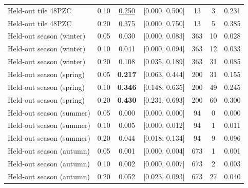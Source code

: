 \begin{table}[t]
\begin{tabular}{lcccccc}
Held-out tile 48PZC & 0.10 & \underline{0.250} & [0.000, 0.500] & 13 & 3 & 0.231 \\
Held-out tile 48PZC & 0.20 & \underline{0.375} & [0.000, 0.750] & 13 & 5 & 0.385 \\
Held-out season (winter) & 0.05 & 0.030 & [0.000, 0.083] & 363 & 10 & 0.028 \\
Held-out season (winter) & 0.10 & 0.041 & [0.000, 0.094] & 363 & 12 & 0.033 \\
Held-out season (winter) & 0.20 & 0.108 & [0.035, 0.189] & 363 & 31 & 0.085 \\
Held-out season (spring) & 0.05 & \textbf{0.217} & [0.063, 0.444] & 200 & 31 & 0.155 \\
Held-out season (spring) & 0.10 & \textbf{0.346} & [0.148, 0.635] & 200 & 49 & 0.245 \\
Held-out season (spring) & 0.20 & \textbf{0.430} & [0.231, 0.693] & 200 & 60 & 0.300 \\
Held-out season (summer) & 0.05 & 0.000 & [0.000, 0.000] & 94 & 0 & 0.000 \\
Held-out season (summer) & 0.10 & 0.005 & [0.000, 0.012] & 94 & 1 & 0.011 \\
Held-out season (summer) & 0.20 & 0.044 & [0.018, 0.134] & 94 & 9 & 0.096 \\
Held-out season (autumn) & 0.05 & 0.001 & [0.000, 0.004] & 673 & 1 & 0.001 \\
Held-out season (autumn) & 0.10 & 0.002 & [0.000, 0.007] & 673 & 2 & 0.003 \\
Held-out season (autumn) & 0.20 & 0.052 & [0.023, 0.093] & 673 & 27 & 0.040 \\
\bottomrule
\end{tabular}
\end{table}
